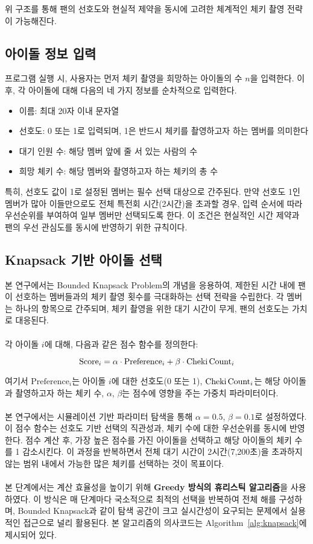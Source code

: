 \documentclass[12pt,hidelinks]{article}
\begin{document}
\noindent 위 구조를 통해 팬의 선호도와 현실적 제약을 동시에 고려한 체계적인 체키 촬영 전략이 가능해진다.

\subsection{아이돌 정보 입력}
프로그램 실행 시, 사용자는 먼저 체키 촬영을 희망하는 아이돌의 수 $n$을 입력한다. 이후, 각 아이돌에 대해 다음의 네 가지 정보를 순차적으로 입력한다.

\begin{itemize}
	\item 이름: 최대 20자 이내 문자열
	\item 선호도: 0 또는 1로 입력되며, 1은 반드시 체키를 촬영하고자 하는 멤버를 의미한다
	\item 대기 인원 수: 해당 멤버 앞에 줄 서 있는 사람의 수
	\item 희망 체키 수: 해당 멤버와 촬영하고자 하는 체키의 총 수
\end{itemize}

\noindent 특히, 선호도 값이 1로 설정된 멤버는 필수 선택 대상으로 간주된다. 만약 선호도 1인 멤버가 많아 이들만으로도 전체 특전회 시간(2시간)을 초과할 경우, 입력 순서에 따라 우선순위를 부여하여 일부 멤버만 선택되도록 한다. 이 조건은 현실적인 시간 제약과 팬의 우선 관심도를 동시에 반영하기 위한 규칙이다.

\subsection{Knapsack 기반 아이돌 선택}
본 연구에서는 Bounded Knapsack Problem의 개념을 응용하여, 제한된 시간 내에 팬이 선호하는 멤버들과의 체키 촬영 횟수를 극대화하는 선택 전략을 수립한다. 각 멤버는 하나의 항목으로 간주되며, 체키 촬영을 위한 대기 시간이 무게, 팬의 선호도는 가치로 대응된다.
\\
\\
각 아이돌 $i$에 대해, 다음과 같은 점수 함수를 정의한다:

\[
\text{Score}_i = \alpha \cdot \text{Preference}_i + \beta \cdot \text{Cheki\,Count}_i
\]

\noindent 여기서 $\text{Preference}_i$는 아이돌 $i$에 대한 선호도(0 또는 1), $\text{Cheki\,Count}_i$는 해당 아이돌과 촬영하고자 하는 체키 수, $\alpha$, $\beta$는 점수에 영향을 주는 가중치 파라미터이다.
\\
\\
\noindent 본 연구에서는 시뮬레이션 기반 파라미터 탐색을 통해 $\alpha = 0.5$, $\beta = 0.1$로 설정하였다. 이 점수 함수는 선호도 기반 선택의 직관성과, 체키 수에 대한 우선순위를 동시에 반영한다. 점수 계산 후, 가장 높은 점수를 가진 아이돌을 선택하고 해당 아이돌의 체키 수를 1 감소시킨다. 이 과정을 반복하면서 전체 대기 시간이 2시간(7,200초)을 초과하지 않는 범위 내에서 가능한 많은 체키를 선택하는 것이 목표이다.
\\
\\
본 단계에서는 계산 효율성을 높이기 위해 \textbf{Greedy 방식의 휴리스틱 알고리즘}을 사용하였다. 이 방식은 매 단계마다 국소적으로 최적의 선택을 반복하여 전체 해를 구성하며, Bounded Knapsack과 같이 탐색 공간이 크고 실시간성이 요구되는 문제에서 실용적인 접근으로 널리 활용된다. 본 알고리즘의 의사코드는 Algorithm~\ref{alg:knapsack}에 제시되어 있다.
\end{document}
